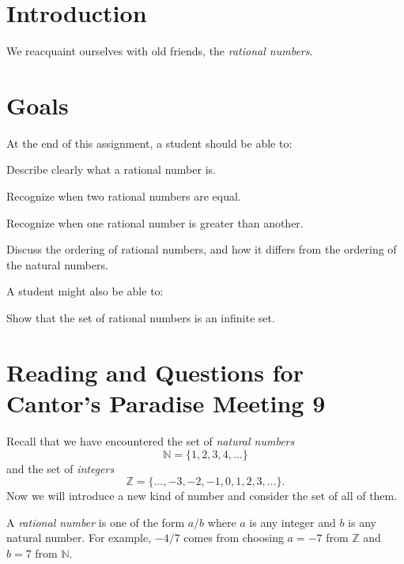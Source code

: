 \documentclass[12pt,letterpaper]{article}
\theoremstyle{definition}
\begin{document}
\setlength{\parskip}{1ex plus 0.5ex minus 0.2ex}
\setlength{\parindent}{0pt}

\pagestyle{fancy}
\cfoot{}

\section*{Introduction}
We reacquaint ourselves with old friends, the \emph{rational numbers}.

\section*{Goals}
At the end of this assignment, a student should be able to:
\begin{compactitem}
\item Describe clearly what a rational number is.
\item Recognize when two rational numbers are equal.
\item Recognize when one rational number is greater than another.
\item Discuss the ordering of rational numbers, and how it differs from the ordering of the natural numbers.
\end{compactitem}
A student might also be able to:
\begin{compactitem}
\item Show that the set of rational numbers is an infinite set.
\end{compactitem}

\section*{Reading and Questions for Cantor's Paradise Meeting 9}

Recall that we have encountered the set of \emph{natural numbers}
\[
\mathbb{N} = \{1, 2, 3, 4, \ldots\}
\]
and the set of \emph{integers}
\[
\mathbb{Z} = \{ \ldots, -3, -2, -1, 0, 1, 2, 3, \ldots\}.
\]
Now we will introduce a new kind of number and consider the set of all of them.

A \emph{rational number} is one of the form $a/b$ where $a$ is any integer and $b$ is any natural number. 
For example, $-4/7$ comes from choosing $a = -7$ from $\mathbb{Z}$ and $b= 7$ from $\mathbb{N}$.
\end{document}
